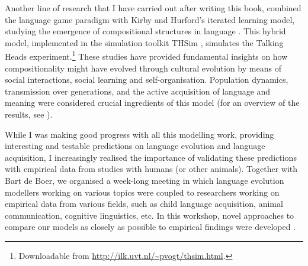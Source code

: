 Another line of research that I have carried out after writing this book, combined the language game paradigm with Kirby and Hurford's \citeyear{kirbyhurford:2002} {\sc iterated learning model}, studying the emergence of compositional structures in language \citep{vogt:2005a,vogt:2005b}. This hybrid model, implemented in the simulation toolkit THSim \citep{vogt:2003c}, simulates the Talking Heads experiment.\footnote{Downloadable from \url{http://ilk.uvt.nl/\~pvogt/thsim.html}.} These studies have provided fundamental insights on how compositionality might have evolv\-ed through cultural evolution by means of social interactions, social learning and self-organisation. Population dynamics, transmission over generations, and the active acquisition of language and meaning were considered crucial ingredients of this model (for an overview of the results, see \citealt{vogt:2007b}).  

While I was making good progress with all this modelling work, providing interesting and testable predictions on language evolution and language acquisition, I increasingly realised the importance of validating these predictions with empirical data from studies with humans (or other animals). Together with Bart de Boer, we organised a week-long meeting in which language evolution modellers working on various topics were coupled to researchers working on empirical data from various fields, such as child language acquisition, animal communication, cognitive linguistics, etc. In this workshop, novel approaches to compare our models as closely as possible to empirical findings were developed \citep{vogtdeboer:2010}.


